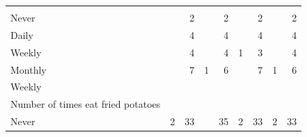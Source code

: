 \documentclass{article}
\begin{document}
\begin{table}[!h]
{\begin{tabular}{lllllllll}
			\multicolumn{1}{|r}{} &
			\multicolumn{1}{r}{} &
			\multicolumn{1}{r}{} &
			\multicolumn{1}{r}{} &
			\multicolumn{1}{r}{} &
			\multicolumn{1}{r}{} &
			\multicolumn{1}{r}{} &
			\multicolumn{1}{r}{} \\
			\multicolumn{1}{l}{\hspace{5em}Never} &
			\multicolumn{1}{|r}{} &
			\multicolumn{1}{r}{2} &
			\multicolumn{1}{r}{} &
			\multicolumn{1}{r}{2} &
			\multicolumn{1}{r}{} &
			\multicolumn{1}{r}{2} &
			\multicolumn{1}{r}{} &
			\multicolumn{1}{r}{2} \\
			\multicolumn{1}{l}{\hspace{5em}Daily} &
			\multicolumn{1}{|r}{} &
			\multicolumn{1}{r}{4} &
			\multicolumn{1}{r}{} &
			\multicolumn{1}{r}{4} &
			\multicolumn{1}{r}{} &
			\multicolumn{1}{r}{4} &
			\multicolumn{1}{r}{} &
			\multicolumn{1}{r}{4} \\
			\multicolumn{1}{l}{\hspace{5em}Weekly} &
			\multicolumn{1}{|r}{} &
			\multicolumn{1}{r}{4} &
			\multicolumn{1}{r}{} &
			\multicolumn{1}{r}{4} &
			\multicolumn{1}{r}{1} &
			\multicolumn{1}{r}{3} &
			\multicolumn{1}{r}{} &
			\multicolumn{1}{r}{4} \\
			\multicolumn{1}{l}{\hspace{5em}Monthly} &
			\multicolumn{1}{|r}{} &
			\multicolumn{1}{r}{7} &
			\multicolumn{1}{r}{1} &
			\multicolumn{1}{r}{6} &
			\multicolumn{1}{r}{} &
			\multicolumn{1}{r}{7} &
			\multicolumn{1}{r}{1} &
			\multicolumn{1}{r}{6} \\
			\multicolumn{1}{l}{\hspace{3em}Weekly} &
			\multicolumn{1}{|r}{} &
			\multicolumn{1}{r}{} &
			\multicolumn{1}{r}{} &
			\multicolumn{1}{r}{} &
			\multicolumn{1}{r}{} &
			\multicolumn{1}{r}{} &
			\multicolumn{1}{r}{} &
			\multicolumn{1}{r}{} \\
			\multicolumn{1}{l}{\hspace{4em}Number of times eat fried potatoes} &
			\multicolumn{1}{|r}{} &
			\multicolumn{1}{r}{} &
			\multicolumn{1}{r}{} &
			\multicolumn{1}{r}{} &
			\multicolumn{1}{r}{} &
			\multicolumn{1}{r}{} &
			\multicolumn{1}{r}{} &
			\multicolumn{1}{r}{} \\
			\multicolumn{1}{l}{\hspace{5em}Never} &
			\multicolumn{1}{|r}{2} &
			\multicolumn{1}{r}{33} &
			\multicolumn{1}{r}{} &
			\multicolumn{1}{r}{35} &
			\multicolumn{1}{r}{2} &
			\multicolumn{1}{r}{33} &
			\multicolumn{1}{r}{2} &
			\multicolumn{1}{r}{33} \\

\end{tabular}}
\end{table}
\end{document}
